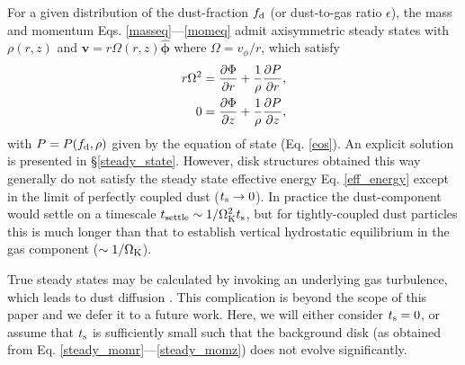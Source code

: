 For a given distribution of the dust-fraction $f_\mathrm{d}$ (or
dust-to-gas ratio $\epsilon$), the 
mass and momentum Eqs. \ref{masseq}---\ref{momeq} admit     
axisymmetric steady states with $\rho(r,z)$ and 
$\bm{v}=r\Omega(r,z)\hat{\bm{\phi}}$ where $\Omega = v_\phi/r$, which satisfy 
\begin{align}
  r\Omega^2 &= \frac{\partial \Phi}{\partial r} + \frac{1}{\rho}\frac{\partial P}{\partial
    r},\label{steady_momr}\\
  0 & = \frac{\partial\Phi}{\partial z} + \frac{1}{\rho}\frac{\partial P}{\partial z},\label{steady_momz}
\end{align}
with $P=P(f_\mathrm{d},\rho)$ given by the equation of state
(Eq. \ref{eos}). An explicit solution is presented in
\S\ref{steady_state}.  
However, disk structures obtained this way generally do not satisfy 
the steady state effective energy Eq. \ref{eff_energy} 
except in the limit of perfectly coupled dust ($t_\mathrm{s}\to0$).  In
practice the dust-component would settle on a timescale
$t_\mathrm{settle}\sim 1/\Omega_{\rm K}^2t_\mathrm{s}$, but for tightly-coupled dust
particles this is much longer than that to establish vertical
hydrostatic equilibrium in the gas component ($\sim 1/\Omega_{\rm K}$).   

True steady states may be calculated by invoking an underlying gas
turbulence, which leads to dust diffusion \citep{takeuchi02, youdin07, 
  lyra13}. This complication is beyond the scope of this paper and we 
defer it to a future work. Here, we will either consider $t_\mathrm{s} = 0$,
or assume that $t_\mathrm{s}$ is sufficiently small such that the background
disk (as obtained from Eq. \ref{steady_momr}---\ref{steady_momz}) does 
not evolve significantly.  %



